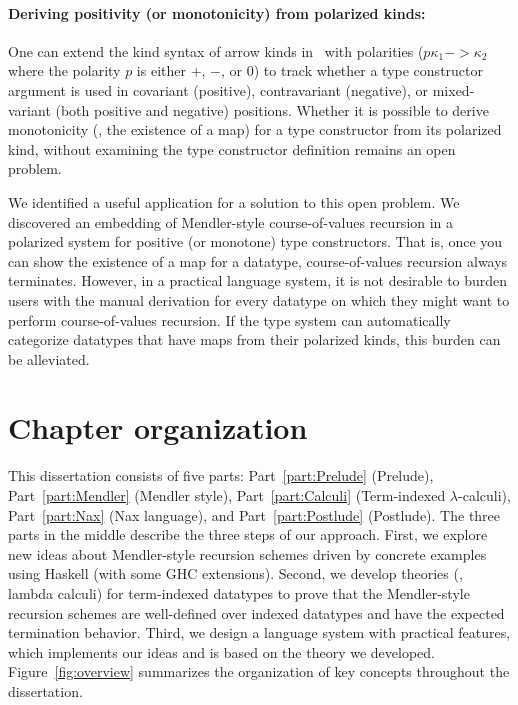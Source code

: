 \paragraph{Deriving positivity (or monotonicity) from polarized kinds:}
One can extend the kind syntax of arrow kinds in \Fw\ with polarities
($p\kappa_1 -> \kappa_2$ where the polarity $p$ is either $+$, $-$, or $0$)
to track whether a type constructor argument is used in
covariant (positive), contravariant (negative), or
mixed-variant (both positive and negative) positions.
Whether it is possible to derive monotonicity (\ie, the  existence of a map)
for a type constructor from its polarized kind, without examining
the type constructor definition remains an open problem.

We identified a useful application for a solution to this open problem.
We discovered an embedding of Mendler-style course-of-values recursion in
a polarized system for positive (or monotone) type constructors.
That is, once you can show the existence of a map for a datatype,
course-of-values recursion always terminates.
However, in a practical language system, it is not desirable to burden users
with the manual derivation for every datatype on which they might want to
perform course-of-values recursion. If the type system can automatically
categorize datatypes that have maps from their polarized kinds,
this burden can be alleviated.

\section{Chapter organization}\label{sec:intro:overview}
This dissertation consists of five parts:
Part~\ref{part:Prelude} (Prelude),
Part~\ref{part:Mendler} (Mendler style),
Part~\ref{part:Calculi} (Term-indexed $\lambda$-calculi),
Part~\ref{part:Nax} (Nax language), and
Part~\ref{part:Postlude} (Postlude).
The three parts in the middle describe the three steps of our approach. 
First, we explore new ideas about
Mendler-style recursion schemes driven by concrete examples
using Haskell (with some GHC extensions). Second, we develop
theories (\ie, lambda calculi) for term-indexed datatypes to prove that
the Mendler-style recursion schemes are well-defined over indexed datatypes
and have the expected termination behavior. Third, we design a language system
with practical features, which implements our ideas and is based on the
theory we developed. Figure~\ref{fig:overview} summarizes
the organization of key concepts throughout the dissertation.

